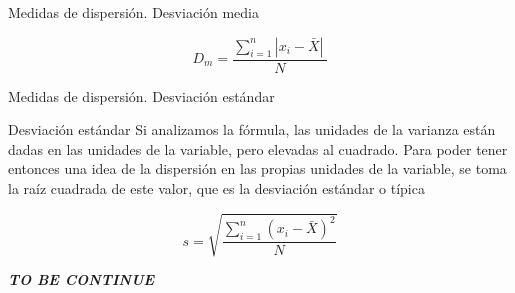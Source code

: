 \documentclass[11pt]{beamer}
\begin{document}
        \begin{frame}{Medidas de dispersión. Desviación media}

            $$D_m = \dfrac{\sum_{i=1}^{n}|x_i-\bar{X}|~}{N}$$
        \end{frame}

        \begin{frame}{Medidas de dispersión. Desviación estándar}
            \begin{block}{Desviación estándar}
              Si analizamos la fórmula, las unidades de la varianza están dadas en las unidades de la variable, pero elevadas al cuadrado. Para poder tener entonces una idea de la dispersión en las propias unidades de la variable, se toma la raíz cuadrada de este valor, que es la desviación estándar o típica
            \end{block}

            $$s =\sqrt{ \dfrac{\sum_{i=1}^{n}(x_i-\bar{X})^2}{N}}$$
        \end{frame}




    \begin{frame}
      \centering
      \textit{\textbf{ \huge  TO BE CONTINUE}}
    \end{frame}
\end{document}
